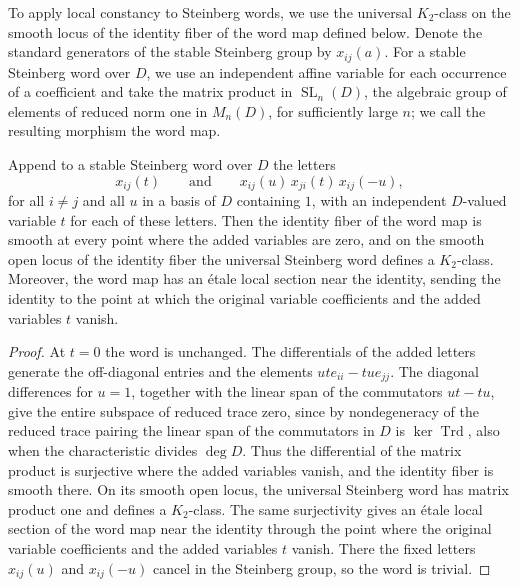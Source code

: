 To apply local constancy to Steinberg words, we use the universal $K_2$-class on the smooth locus of the identity fiber of the word map defined below.
Denote the standard generators of the stable Steinberg group by $x_{ij}(a)$.
For a stable Steinberg word over $D$, we use an independent affine variable for each occurrence of a coefficient and take the matrix product in $\operatorname{SL}_n(D)$, the algebraic group of elements of reduced norm one in $M_n(D)$, for sufficiently large $n$; we call the resulting morphism the word map.

\begin{lemma}\label{lem:paper-steinberg-fiber}
Append to a stable Steinberg word over $D$ the letters
\[
 x_{ij}(t)\qquad\text{and}\qquad x_{ij}(u)\,x_{ji}(t)\,x_{ij}(-u),
\]
for all $i\ne j$ and all $u$ in a basis of $D$ containing $1$, with an independent $D$-valued variable $t$ for each of these letters.
Then the identity fiber of the word map is smooth at every point where the added variables are zero, and on the smooth open locus of the identity fiber the universal Steinberg word defines a $K_2$-class.
Moreover, the word map has an \'etale local section near the identity, sending the identity to the point at which the original variable coefficients and the added variables $t$ vanish.
\end{lemma}
\begin{proof}
At $t=0$ the word is unchanged.
The differentials of the added letters generate the off-diagonal entries and the elements $ute_{ii}-tue_{jj}$.
The diagonal differences for $u=1$, together with the linear span of the commutators $ut-tu$, give the entire subspace of reduced trace zero, since by nondegeneracy of the reduced trace pairing the linear span of the commutators in $D$ is $\ker\operatorname{Trd}$, also when the characteristic divides $\deg D$.
Thus the differential of the matrix product is surjective where the added variables vanish, and the identity fiber is smooth there.
On its smooth open locus, the universal Steinberg word has matrix product one and defines a $K_2$-class.
The same surjectivity gives an \'etale local section of the word map near the identity through the point where the original variable coefficients and the added variables $t$ vanish.
There the fixed letters $x_{ij}(u)$ and $x_{ij}(-u)$ cancel in the Steinberg group, so the word is trivial.
\end{proof}

